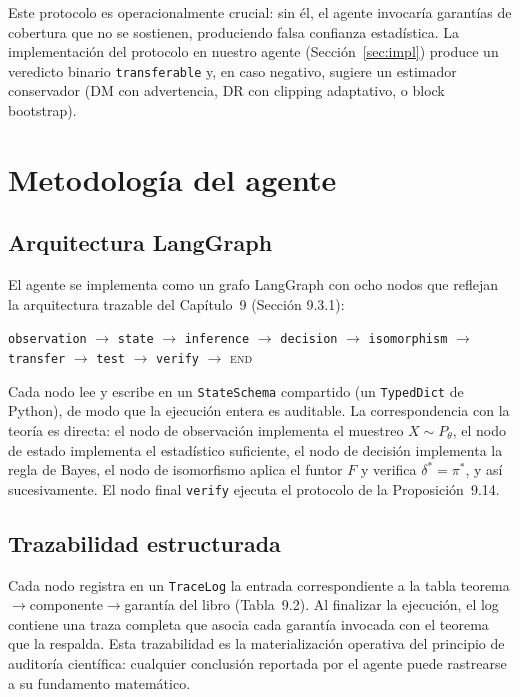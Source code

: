 \documentclass[11pt,a4paper]{article}
\theoremstyle{mitheorem}
\theoremstyle{mitdef}
\newcommand{\decrule}{\delta}
\newcommand{\policy}{\pi}
\begin{document}
Este protocolo es operacionalmente crucial: sin él, el agente
invocaría garantías de cobertura que no se sostienen, produciendo
falsa confianza estadística. La implementación del protocolo en
nuestro agente (Sección~\ref{sec:impl}) produce un veredicto
binario \texttt{transferable} y, en caso negativo, sugiere un
estimador conservador (DM con advertencia, DR con clipping
adaptativo, o block bootstrap).

\section{Metodología del agente}
\label{sec:metodo}

\subsection{Arquitectura LangGraph}

El agente se implementa como un grafo LangGraph con ocho nodos que
reflejan la arquitectura trazable del Capítulo~9 (Sección 9.3.1):

\begin{center}
\sffamily\small
\texttt{observation} $\to$ \texttt{state} $\to$ \texttt{inference} $\to$
\texttt{decision} $\to$ \texttt{isomorphism} $\to$ \texttt{transfer} $\to$
\texttt{test} $\to$ \texttt{verify} $\to$ \textsc{end}
\end{center}

Cada nodo lee y escribe en un \texttt{StateSchema} compartido (un
\texttt{TypedDict} de Python), de modo que la ejecución entera es
auditable. La correspondencia con la teoría es directa: el nodo de
observación implementa el muestreo $X\sim P_\theta$, el nodo de
estado implementa el estadístico suficiente, el nodo de decisión
implementa la regla de Bayes, el nodo de isomorfismo aplica el funtor
$F$ y verifica $\decrule^*=\policy^*$, y así sucesivamente. El nodo
final \texttt{verify} ejecuta el protocolo de la Proposición~9.14.

\subsection{Trazabilidad estructurada}

Cada nodo registra en un \texttt{TraceLog} la entrada correspondiente
a la tabla teorema$\to$componente$\to$garantía del libro (Tabla~9.2).
Al finalizar la ejecución, el log contiene una traza completa que
asocia cada garantía invocada con el teorema que la respalda. Esta
trazabilidad es la materialización operativa del principio de
auditoría científica: cualquier conclusión reportada por el agente
puede rastrearse a su fundamento matemático.
\end{document}
